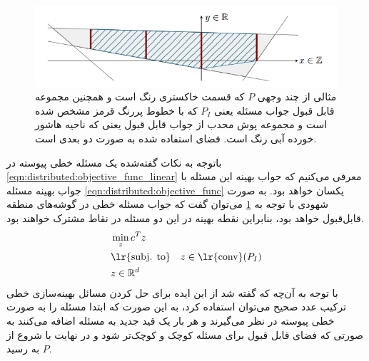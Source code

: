 \begin{figure}[h]
	\centerline{\includegraphics[width=15cm]{graphics/4-heuristic-dist/polyhedron}}
	\caption{مثالی از چند وجهی $P$ که قسمت خاکستری رنگ است و همچنین مجموعه قابل قبول جواب مسئله یعنی $P_I$ که با خطوط پررنگ قرمز مشخص شده است و مجموعه پوش محدب از جواب قابل قبول یعنی  که ناحیه هاشور خورده آبی رنگ است. فضای استفاده شده به صورت دو بعدی است.}
	\label{fig:distributed:polyhedron}
\end{figure}
	باتوجه به نکات گفته‌شده یک مسئله خطی پیوسته در \cref{eqn:distributed:objective_func_linear} معرفی می‌کنیم که جواب بهینه‌ این مسئله با جواب بهینه مسئله \cref{eqn:distributed:objective_func} یکسان خواهد بود. به صورت شهودی با توجه به \cref{fig:distributed:polyhedron} می‌توان گفت که جواب مسئله خطی در گوشه‌های منطقه‌ قابل‌قبول خواهد بود، بنابراین نقطه بهینه در این دو مسئله در نقاط مشترک خواهند بود. 
	\begin{align}\label{eqn:distributed:objective_func_linear}
	&\min_{z}c^Tz \notag \\
	&\text{\lr{subj. to}} \quad z \in \text{\lr{conv}}(P_I) \notag \\
	&z \in \mathbb{R}^d
	\end{align}
	با توجه به آن‌چه که گفته شد از این ایده برای حل کردن مسائل بهینه‌سازی خطی ترکیب عدد صحیح می‌توان استفاده کرد، به این صورت که ابتدا مسئله را به صورت خطی پیوسته در نظر می‌گیرند و هر بار یک قید جدید به مسئله اضافه می‌کنند به صورتی که فضای قابل قبول برای مسئله کوچک و کوچک‌تر شود و در نهایت با شروع از $P$ به  رسید.
	

